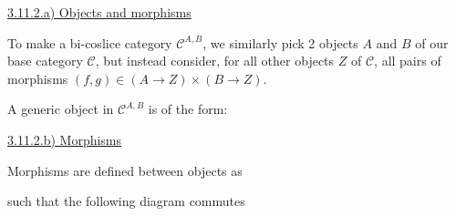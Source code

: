 \documentclass[12pt, letterpaper, twoside]{report}
\begin{document}
\vspace{5mm}
\underline{3.11.2.a) Objects and morphisms}

To make a bi-coslice category $\mathcal{C}^{A,B}$, we similarly pick 2 objects $A$ and $B$ of our base category $\mathcal{C}$, but instead consider, for all other objects $Z$ of $\mathcal{C}$, all pairs of morphisms $(f, g) \in (A \to Z) \times (B \to Z)$.

A generic object in $\mathcal{C}^{A,B}$ is of the form:



\vspace{5mm}
\underline{3.11.2.b) Morphisms}

Morphisms are defined between objects as


such that the following diagram commutes

\end{document}
